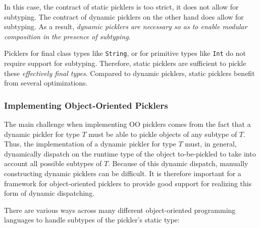 \documentclass[preprint,10pt]{sigplanconf}
\theoremstyle{definition}
\theoremstyle{definition}
\newcommand{\term}[1]{\mbox{\texttt{#1}}}
\begin{document}
In this case, the contract of static picklers is too strict, it does not allow
for subtyping. The contract of dynamic picklers on the other hand does allow
for subtyping. As a result, {\em dynamic picklers are necessary so as to enable
modular composition in the presence of subtyping}.

Picklers for final class types like \term{String}, or for primitive types like
\term{Int} do not require support for subtyping. Therefore, static picklers
are sufficient to pickle these {\em effectively final types}. Compared to
dynamic picklers, static picklers benefit from several optimizations.

\subsubsection{Implementing Object-Oriented Picklers}

The main challenge when implementing OO picklers comes from the fact that a
dynamic pickler for type $T$ must be able to pickle objects of any subtype of
$T$. Thus, the implementation of a dynamic pickler for type $T$ must, in
general, dynamically dispatch on the runtime type of the object to-be-pickled
to take into account all possible subtypes of $T$. Because of this dynamic
dispatch, manually constructing dynamic picklers can be difficult. It is
therefore important for a framework for object-oriented picklers to provide
good support for realizing this form of dynamic dispatching.

There are various ways across many different object-oriented programming
languages to handle subtypes of the pickler's static type:
\end{document}
